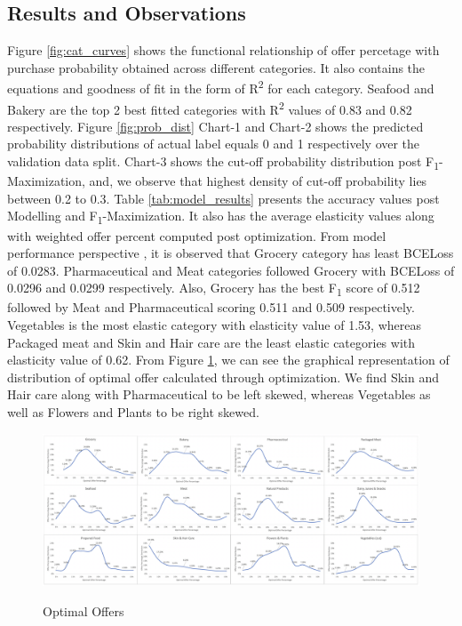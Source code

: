 \subsection{Results and Observations}
Figure \ref{fig:cat_curves} shows the functional relationship of offer percetage with purchase probability 
obtained across different categories. It also contains the equations and goodness of fit in the 
form of R\textsuperscript{2} for each category. Seafood and Bakery are the top 2 best fitted categories
with R\textsuperscript{2} values of 0.83 and 0.82 respectively. Figure \ref{fig:prob_dist} Chart-1 and Chart-2 shows the 
predicted probability distributions of actual label equals 0 and 1 respectively over the validation data split.
Chart-3 shows the cut-off probability distribution post F\textsubscript{1}-Maximization, and, we observe 
that highest density of cut-off probability lies between 0.2 to 0.3. Table \ref{tab:model_results} presents the 
accuracy values post Modelling and F\textsubscript{1}-Maximization. It also has the average elasticity values 
along with weighted offer percent computed post optimization. From model performance perspective
, it is observed that Grocery category has least BCELoss of 0.0283. Pharmaceutical and Meat categories
followed Grocery with BCELoss of 0.0296 and 0.0299 respectively. Also, Grocery has the best
F\textsubscript{1} score of 0.512 followed by Meat and Pharmaceutical scoring 0.511 and 0.509
respectively. Vegetables is the most elastic category with elasticity value of 1.53, whereas 
Packaged meat and Skin and Hair care are the least elastic categories with elasticity value of 0.62.
From Figure \ref{fig:optimize}, we can see the graphical representation of distribution of 
optimal offer calculated through optimization. We find Skin and Hair care along with Pharmaceutical to be 
left skewed, whereas Vegetables as well as Flowers and Plants to be right skewed.
 \begin{figure}[hbt!]
    \centering 
    \caption{Optimal Offers} 
    \includegraphics[width=5.5in]{img/optimize.png} 
    \label{fig:optimize} 
  \end{figure}
